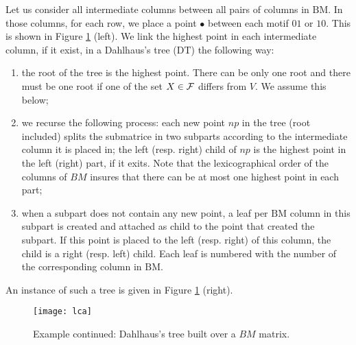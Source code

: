 \documentclass{llncs}
\begin{document}
Let us consider all intermediate columns between all pairs
of columns in $\mbox{BM}.$ In those columns, for each row, we place a
point $\bullet$ between each motif $01$ or $10$. This is shown in Figure
\ref{lcapic} (left).  We link the highest point in each intermediate
column, if it exist, in a Dahlhaus's tree ($\mbox{DT}$) the following way: 
\begin{enumerate}
\item the root of the tree is the highest point. There can be only one
  root and there must be one root if one of the set $X \in {\cal F}$ differs
  from $V$. We assume this below;
\item we recurse the following process: each new point $np$ in the
  tree (root included) splits the submatrice in two subparts according
  to the intermediate column it is placed in; the left (resp. right)
  child of $np$ is the highest point in the left (right) part, if it
  exits. Note that the lexicographical order of the columns of $BM$
  insures that there can be at most one highest point in each part;
\item when a subpart does not contain any new point, a leaf per
$\mbox{BM}$ column in this subpart is created and attached as child to
the point that created the subpart. If this point is placed to the
left (resp. right) of this column, the child is a right (resp. left)
child. Each leaf is numbered with the number of the corresponding
column in $\mbox{BM}.$
\end{enumerate}

\noindent
An instance of such a tree is given in Figure \ref{lcapic} (right). 


\begin{figure}[htb]
\centering \texttt{[image: lca]}
\vspace{-0.7cm}
\caption{Example continued: Dahlhaus's tree built over a $BM$ matrix.}
 \label{lcapic}
\end{figure}
\end{document}
